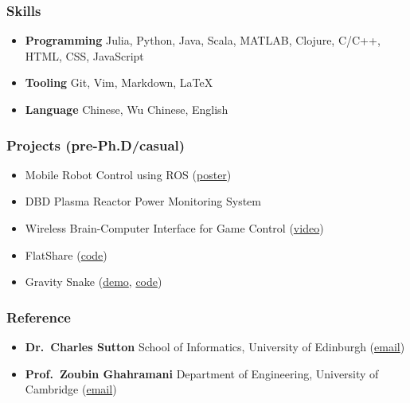 \documentclass[11pt, a4paper]{article}
\providecommand{\tightlist}{%
  \setlength{\itemsep}{0pt}\setlength{\parskip}{0pt}}
\begin{document}
\begin{raggedright}
\subsubsection{Skills}

\begin{itemize}
\tightlist
\item
  \textbf{Programming} Julia, Python, Java, Scala, MATLAB, Clojure,
  C/C++, HTML, CSS, JavaScript
\item
  \textbf{Tooling} Git, Vim, Markdown, LaTeX
\item
  \textbf{Language} Chinese, Wu Chinese, English
\end{itemize}

\subsubsection{Projects (pre-Ph.D/casual)}

\begin{itemize}
\tightlist
\item
  Mobile Robot Control using ROS
  (\href{./assets/images/fyp.png}{poster})
\item
  DBD Plasma Reactor Power Monitoring System
\item
  Wireless Brain-Computer Interface for Game Control
  (\href{https://www.youtube.com/watch?v=ysmLmQ8NfEY}{video})
\item
  FlatShare (\href{https://github.com/xukai92/flatshare}{code})
\item
  Gravity Snake (\href{http://xuk.ai/gravity_snake/}{demo},
  \href{https://github.com/xukai92/gravity_snake}{code})
\end{itemize}

\subsubsection{Reference}

\begin{itemize}
\tightlist
\item
  \textbf{Dr.~Charles Sutton} School of Informatics, University of
  Edinburgh (\href{mailto:csutton@inf.ed.ac.uk}{email})
\item
  \textbf{Prof.~Zoubin Ghahramani} Department of Engineering, University
  of Cambridge (\href{mailto:zoubin@eng.cam.ac.uk}{email})
\end{itemize}
\end{raggedright}
\end{document}
